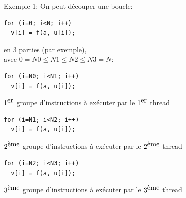 \documentclass{beamer}
\begin{document}
\begin{frame}[fragile]
Exemple 1:
\vfill
On peut découper une boucle: 
\begin{lstlisting}
for (i=0; i<N; i++)
  v[i] = f(a, u[i]);
\end{lstlisting}

\vfill
en 3 parties (par exemple), \\ \quad avec $0 = N0 \leq N1 \leq N2 \leq N3 = N$:

\vfill
\begin{minipage}{0.52\textwidth}
	\begin{lstlisting}
for (i=N0; i<N1; i++)
  v[i] = f(a, u[i]);
\end{lstlisting}
\end{minipage}
\begin{minipage}{0.46\textwidth}
	$1^{\hbox{er}}$ groupe d'instructions à exécuter par le $1^{\hbox{er}}$ thread
\end{minipage}

\begin{minipage}{0.52\textwidth}
\begin{lstlisting}
for (i=N1; i<N2; i++)
  v[i] = f(a, u[i]);
\end{lstlisting}
\end{minipage}
\begin{minipage}{0.46\textwidth}
	$2^{\hbox{ème}}$ groupe d'instructions à exécuter par le $2^{\hbox{ème}}$ thread
\end{minipage}

\begin{minipage}{0.52\textwidth}
\begin{lstlisting}
for (i=N2; i<N3; i++)
  v[i] = f(a, u[i]);
\end{lstlisting}
\end{minipage}
\begin{minipage}{0.46\textwidth}
	$3^{\hbox{ème}}$ groupe d'instructions à exécuter par le $3^{\hbox{ème}}$ thread
\end{minipage}

\end{frame}
	
\end{document}
